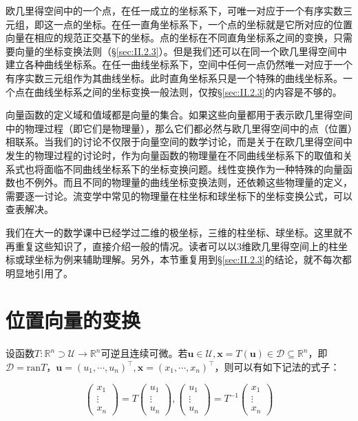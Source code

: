 \documentclass[../main.tex]{subfiles}
\begin{document}
欧几里得空间中的一个点，在任一成立的坐标系下，可唯一对应于一个有序实数三元组，即这一点的坐标。在任一直角坐标系下，一个点的坐标就是它所对应的位置向量在相应的规范正交基下的坐标。点的坐标在不同直角坐标系之间的变换，只需要向量的坐标变换法则（\S\ref{sec:II.2.3}）。但是我们还可以在同一个欧几里得空间中建立各种曲线坐标系。在任一曲线坐标系下，空间中任何一点仍然唯一对应于一个有序实数三元组作为其曲线坐标。此时直角坐标系只是一个特殊的曲线坐标系。一个点在曲线坐标系之间的坐标变换一般法则，仅按\S\ref{sec:II.2.3}的内容是不够的。

向量函数的定义域和值域都是向量的集合。如果这些向量都用于表示欧几里得空间中的物理过程（即它们是物理量），那么它们都必然与欧几里得空间中的点（位置）相联系。当我们的讨论不仅限于向量空间的数学讨论，而是关于在欧几里得空间中发生的物理过程的讨论时，作为向量函数的物理量在不同曲线坐标系下的取值和关系式也将面临不同曲线坐标系下的坐标变换问题。线性变换作为一种特殊的向量函数也不例外。而且不同的物理量的曲线坐标变换法则，还依赖这些物理量的定义，需要逐一讨论。流变学中常见的物理量在柱坐标和球坐标下的坐标变换公式，可以查表解决。

我们在大一的数学课中已经学过二维的极坐标，三维的柱坐标、球坐标。这里就不再重复这些知识了，直接介绍一般的情况。读者可以以3维欧几里得空间上的柱坐标或球坐标为例来辅助理解。另外，本节重复用到\S\ref{sec:II.2.3}的结论，就不每次都明显地引用了。

\section{位置向量的变换}
设函数$T:\mathbb{R}^n\supset\mathcal{U}\rightarrow\mathbb{R}^n$可逆且连续可微。若$\mathbf{u}\in\mathcal{U},\mathbf{x}=T\left(\mathbf{u}\right)\in\mathcal{D}\subseteq\mathbb{R}^n$，即$\mathcal{D}=\mathrm{ran}T$，$\mathbf{u}=\left(u_1,\cdots,u_n\right)^\intercal,\mathbf{x}=\left(x_1,\cdots,x_n\right)^\intercal$，则可以有如下记法的式子：

\begin{equation*}
    \left(\begin{array}{c}x_1\\\vdots\\x_n\end{array}\right)=T\left(\begin{array}{c}u_1\\\vdots\\u_n\end{array}\right),\left(\begin{array}{c}u_1\\\vdots\\u_n\end{array}\right)=T^{-1}\left(\begin{array}{c}x_1\\\vdots\\x_n\end{array}\right)
\end{equation*}
\end{document}
